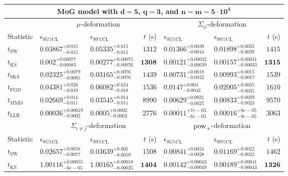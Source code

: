 \begin{tabular}{l|llr|llr}
	\toprule
	\multicolumn{7}{c}{{\bf MoG model with $\mathbf{d=5}$, $\mathbf{q=3}$, and $\mathbf{n=m=5\cdot 10^{4}}$}} \\
	\toprule
	\multicolumn{1}{c}{} & \multicolumn{3}{c}{$\mu$-deformation} & \multicolumn{3}{c}{$\Sigma_{ii}$-deformation} \\
	Statistic & $\epsilon_{95\%\mathrm{CL}}$ & $\epsilon_{99\%\mathrm{CL}}$ & $t$ (s) & $\epsilon_{95\%\mathrm{CL}}$ & $\epsilon_{99\%\mathrm{CL}}$ & $t$ (s) \\
	\midrule
	$t_{\mathrm{SW}}$ & $0.03867_{-0.015}^{+0.015}$ & $0.05335_{-0.015}^{+0.015}$ & $1312$ & $0.01366_{-0.0044}^{+0.0039}$ & $0.01898_{-0.0039}^{+0.0035}$ & $1415$ \\
	$t_{\overline{\mathrm{KS}}}$ & ${\mathbf{0.002_{-0.00083}^{+0.00077}}}$ & ${\mathbf{0.00277_{-0.00076}^{+0.00075}}}$ & ${\mathbf{1308}}$ & ${\mathbf{0.00121_{-0.00039}^{+0.00032}}}$ & ${\mathbf{0.00157_{-0.00033}^{+0.00031}}}$ & ${\mathbf{1315}}$ \\
	$t_{\mathrm{SKS}}$ & $0.02325_{-0.0085}^{+0.0079}$ & $0.03165_{-0.0076}^{+0.0076}$ & $1439$ & $0.00731_{-0.0022}^{+0.0018}$ & $0.00993_{-0.0017}^{+0.0015}$ & $1539$ \\
	$t_{\mathrm{FGD}}$ & $0.04381_{-0.019}^{+0.026}$ & $0.06082_{-0.018}^{+0.024}$ & $1536$ & $0.0147_{-0.0043}^{+0.004}$ & $0.02005_{-0.0035}^{+0.0035}$ & $1610$ \\
	$t_{\mathrm{MMD}}$ & $0.02669_{-0.011}^{+0.014}$ & $0.03545_{-0.011}^{+0.014}$ & $8990$ & $0.00629_{-0.0025}^{+0.0031}$ & $0.00833_{-0.0023}^{+0.0029}$ & $9570$ \\
	$t_{\mathrm{LLR}}$ & $0.00036_{-0.0002}^{+0.00019}$ & $0.0005_{-0.0002}^{+0.0002}$ & $2776$ & $0.00011_{-8e-05}^{+7e-05}$ & $0.00016_{-8e-05}^{+8e-05}$ & $3063$ \\
	\toprule
	\multicolumn{1}{c}{} & \multicolumn{3}{c}{$\Sigma_{i\neq j}$-deformation} & \multicolumn{3}{c}{$\rm{pow}_{+}$-deformation} \\
	Statistic & $\epsilon_{95\%\mathrm{CL}}$ & $\epsilon_{99\%\mathrm{CL}}$ & $t$ (s) & $\epsilon_{95\%\mathrm{CL}}$ & $\epsilon_{99\%\mathrm{CL}}$ & $t$ (s) \\
	\midrule
	$t_{\mathrm{SW}}$ & $0.02657_{-0.0077}^{+0.0058}$ & $0.03639_{-0.0059}^{+0.005}$ & $1508$ & $0.00841_{-0.0028}^{+0.0024}$ & $0.01169_{-0.0023}^{+0.0022}$ & $1462$ \\
	$t_{\overline{\mathrm{KS}}}$ & $1.00116_{-6e-05}^{+0.00055}$ & $1.00165_{-0.00025}^{+0.00018}$ & ${\mathbf{1404}}$ & ${\mathbf{0.00142_{-0.00049}^{+0.00043}}}$ & ${\mathbf{0.00189_{-0.00043}^{+0.00041}}}$ & ${\mathbf{1326}}$ \\

\end{tabular}
